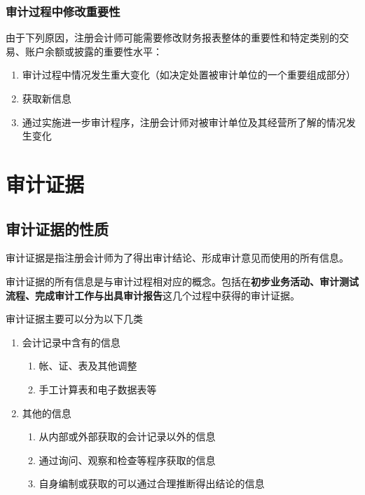 \documentclass[UTF8,12pt]{ctexart}
\numberwithin{equation}{section} %
\numberwithin{figure}{section}
\numberwithin{table}{section}
\begin{document}
	
	\subsubsection{审计过程中修改重要性}
	由于下列原因，注册会计师可能需要修改财务报表整体的重要性和特定类别的交易、账户余额或披露的重要性水平：
	\begin{enumerate}
		\item 审计过程中情况发生重大变化（如决定处置被审计单位的一个重要组成部分）
		
		\item 获取新信息
		
		\item 通过实施进一步审计程序，注册会计师对被审计单位及其经营所了解的情况发生变化
	\end{enumerate}
	
	
	
	
	
	\newpage
	\section{审计证据}	
	\subsection{审计证据的性质}
	审计证据是指注册会计师为了得出审计结论、形成审计意见而使用的所有信息。
	
	审计证据的所有信息是与审计过程相对应的概念。包括在\textbf{初步业务活动、审计测试流程、完成审计工作与出具审计报告}这几个过程中获得的审计证据。
	
	审计证据主要可以分为以下几类
	\begin{enumerate}
		\item 会计记录中含有的信息
		\begin{enumerate}
			\item 帐、证、表及其他调整
			
			\item 手工计算表和电子数据表等
		\end{enumerate}
		
		\item 其他的信息
		\begin{enumerate}
			\item 从内部或外部获取的会计记录以外的信息
			
			\item 通过询问、观察和检查等程序获取的信息
			
			\item 自身编制或获取的可以通过合理推断得出结论的信息
		\end{enumerate}
	\end{enumerate}
	
\end{document}

